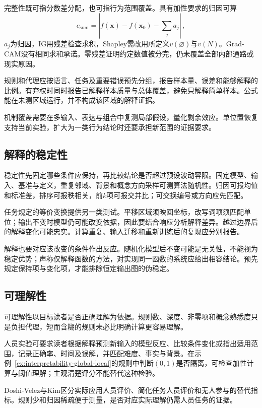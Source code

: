 完整性既可指分数差分配，也可指行为范围覆盖。具有加性要求的归因可算
\[
 e_{\mathrm{sum}}
 =\left|f(\bm{x})-f(\bm{x}_0)-\sum_j a_j\right|\, ,
\]
$a_j$为归因，IG用残差检查求积，Shapley需改用所定义$v(\varnothing)$与$v(N)$。Grad-CAM没有相同求和承诺。零残差证明约定数值被分完，仍未覆盖全部内部通路或现实原因。

规则和代理应按语言、任务及重要错误预先分组，报告样本量、误差和能够解释的比例。有弃权时同时报告已解释样本质量与总体覆盖，避免只解释简单样本。公式能在未测区域运行，并不构成该区域的解释证据。

机制覆盖需要在多输入、表达与组合中复测局部假设，量化剩余效应。单位置恢复支持当前实验，扩大为一类行为结论时还要承担新范围的证据要求。

\subsection{解释的稳定性}
\label{sec:interpretability-quality-stability}

稳定性先固定哪些条件应保持，再比较结论是否超过预设波动容限。固定模型、输入、基准与定义，重复邻域、背景和概念方向采样可测算法随机性。归因可报均值和标准差，排序可报秩相关，前$k$项可报交并比；可交换编号或方向应先匹配。

任务规定的等价变换提供另一类测试。平移区域须映回坐标，改写词项须匹配单位；输出不变时模型仍可能改变依据，因此要结合响应分析解释差异。越过边界后的解释变化可能忠实。计算重复、输入迁移和重新训练后的复现应分别报告。

解释也要对应该改变的条件作出反应。随机化模型后不变可能是无关性，不能视为稳定优势；声称仅解释函数的方法，对实现同一函数的系统应给出相容结论。预先规定保持项与变化项，才能排除恒定输出图的伪稳定。

\subsection{可理解性}
\label{sec:interpretability-quality-comprehensibility}

可理解性以目标读者是否正确理解为依据。规则数、深度、非零项和概念熟悉度只是负担代理，短而含糊的规则未必比明确计算更容易理解。

人员实验可要求读者根据解释预测新输入的模型反应、比较条件变化或指出适用范围，记录正确率、时间及误解，并匹配难度、事实与背景。在示例~\ref{ex:interpretability-global-local}的规则中判断$(0,1)$是否隔离，可检查加性计算与阈值理解；主观清楚评分不能替代这种检验。

Doshi-Velez与Kim区分实际应用人员评价、简化任务人员评价和无人参与的替代指标。规则少和归因稀疏便于测量，是否对应实际理解仍需人员任务的证据。

